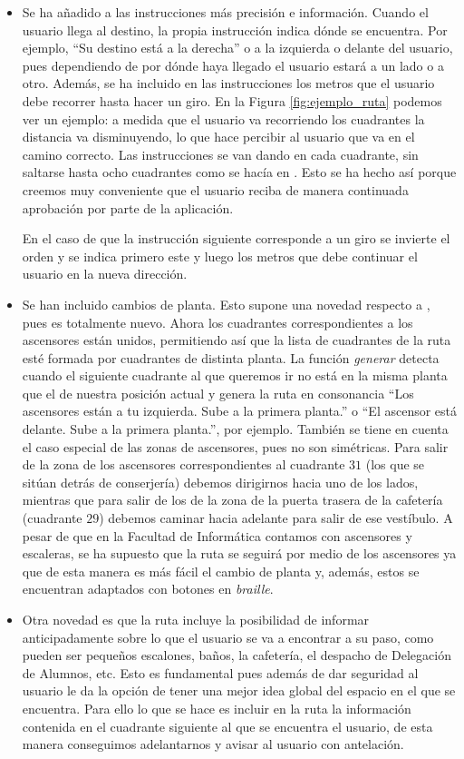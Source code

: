 \begin{itemize}
	\item Se ha añadido a las instrucciones más precisión e información. Cuando el usuario llega al destino, la propia instrucción indica dónde se encuentra. Por ejemplo, ``Su destino está a la derecha'' o a la izquierda o delante del usuario, pues dependiendo de por dónde haya llegado el usuario estará a un lado o a otro. Además, se ha incluido en las instrucciones los metros que el usuario debe recorrer hasta hacer un giro. En la Figura \ref{fig:ejemplo_ruta} podemos ver un ejemplo: a medida que el usuario va recorriendo los cuadrantes la distancia va disminuyendo, lo que hace percibir al usuario que va en el camino correcto. Las instrucciones se van dando en cada cuadrante, sin saltarse hasta ocho cuadrantes como se hacía en \cite{TFGguia}. Esto se ha hecho así porque creemos muy conveniente que el usuario reciba de manera continuada aprobación por parte de la aplicación. 
	
	En el caso de que la instrucción siguiente corresponde a un giro se invierte el orden y se indica primero este y luego los metros que debe continuar el usuario en la nueva dirección.
	
	
	\item Se han incluido cambios de planta. Esto supone una novedad respecto a \cite{TFGguia}, pues es totalmente nuevo. Ahora los cuadrantes correspondientes a los ascensores están unidos, permitiendo así que la lista de cuadrantes de la ruta esté formada por cuadrantes de distinta planta. La función \textit{generar} detecta cuando el siguiente cuadrante al que queremos ir no está en la misma planta que el de nuestra posición actual y genera la ruta en consonancia ``Los ascensores están a tu izquierda. Sube a la primera planta.'' o ``El ascensor está delante. Sube a la primera planta.'', por ejemplo. También se tiene en cuenta el caso especial de las zonas de ascensores, pues no son simétricas. Para salir de la zona de los ascensores correspondientes al cuadrante $31$ (los que se sitúan detrás de conserjería) debemos dirigirnos hacia uno de los lados, mientras que para salir de los de la zona de la puerta trasera de la cafetería (cuadrante $29$) debemos caminar hacia adelante para salir de ese vestíbulo. A pesar de que en la Facultad de Informática contamos con ascensores y escaleras, se ha supuesto que la ruta se seguirá por medio de los ascensores ya que de esta manera es más fácil el cambio de planta y, además, estos se encuentran adaptados con botones en \textit{braille}.
	
	\item Otra novedad es que la ruta incluye la posibilidad de informar anticipadamente sobre lo que el usuario se va a encontrar a su paso, como pueden ser pequeños escalones, baños, la cafetería, el despacho de Delegación de Alumnos, etc. Esto es fundamental pues además de dar seguridad al usuario le da la opción de tener una mejor idea global del espacio en el que se encuentra. Para ello lo que se hace es incluir en la ruta la información contenida en el cuadrante siguiente al que se encuentra el usuario, de esta manera conseguimos adelantarnos y avisar al usuario con antelación.
	
\end{itemize}



